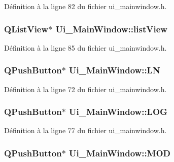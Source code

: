 \-Définition à la ligne 82 du fichier ui\-\_\-mainwindow.\-h.

\hypertarget{class_ui___main_window_aaf97aba343edd00a0114b406c2b77365}{
\subsubsection[{list\-View}]{\setlength{\rightskip}{0pt plus 5cm}\-Q\-List\-View$\ast$ {\bf \-Ui\-\_\-\-Main\-Window\-::list\-View}}}\label{class_ui___main_window_aaf97aba343edd00a0114b406c2b77365}


\-Définition à la ligne 85 du fichier ui\-\_\-mainwindow.\-h.

\hypertarget{class_ui___main_window_a62e9dca715645175577d6143bc93fd9f}{
\subsubsection[{\-L\-N}]{\setlength{\rightskip}{0pt plus 5cm}\-Q\-Push\-Button$\ast$ {\bf \-Ui\-\_\-\-Main\-Window\-::\-L\-N}}}\label{class_ui___main_window_a62e9dca715645175577d6143bc93fd9f}


\-Définition à la ligne 72 du fichier ui\-\_\-mainwindow.\-h.

\hypertarget{class_ui___main_window_a47f156cd397be49d22f6f7fe15b0fde4}{
\subsubsection[{\-L\-O\-G}]{\setlength{\rightskip}{0pt plus 5cm}\-Q\-Push\-Button$\ast$ {\bf \-Ui\-\_\-\-Main\-Window\-::\-L\-O\-G}}}\label{class_ui___main_window_a47f156cd397be49d22f6f7fe15b0fde4}


\-Définition à la ligne 77 du fichier ui\-\_\-mainwindow.\-h.

\hypertarget{class_ui___main_window_a8340a7d6e9beca550e886c360dbc7afb}{
\subsubsection[{\-M\-O\-D}]{\setlength{\rightskip}{0pt plus 5cm}\-Q\-Push\-Button$\ast$ {\bf \-Ui\-\_\-\-Main\-Window\-::\-M\-O\-D}}}\label{class_ui___main_window_a8340a7d6e9beca550e886c360dbc7afb}


